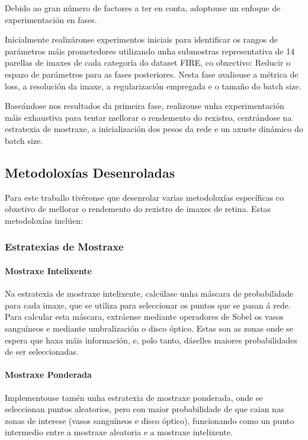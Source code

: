 Debido ao gran número de factores a ter en conta, adoptouse un enfoque de experimentación en fases.

Inicialmente realizáronse experimentos iniciais para identificar os rangos de parámetros máis prometedores utilizando unha submostras representativa de 14 parellas de imaxes de cada categoría do dataset FIRE, co obxectivo: Reducir o espazo de parámetros para as fases posteriores.
Nesta fase avaliouse a métrica de loss, a resolución da imaxe, a regularización empregada e o tamaño do batch size.

Baseándose nos resultados da primeira fase, realizouse unha experimentación máis exhaustiva para tentar mellorar o rendemento do rexistro, centrándose na estratexia de mostraxe, a inicialización dos pesos da rede e un axuste dinámico do batch size.

\subsection{Metodoloxías Desenroladas}
\label{subsec:Metodoloxías Desenroladas}

Para este traballo tivéronse que desenrolar varias metodoloxías específicas co obxetivo de mellorar o rendemento do rexistro de imaxes de retina. Estas metodoloxías inclúen:

\subsubsection{Estratexias de Mostraxe}
\label{subsubsec:estratexias_mostraxe}

\paragraph{Mostraxe Intelixente}
Na estratexia de mostraxe intelixente, calcúlase unha máscara de probabilidade para cada imaxe, que se utiliza para seleccionar os puntos que se pasan á rede. Para calcular esta máscara, extráense mediante operadores de Sobel os vasos sanguíneos e mediante umbralización o disco óptico. Estas son as zonas onde se espera que haxa máis información, e, polo tanto, dáselles maiores probabilidades de ser seleccionadas.

\paragraph{Mostraxe Ponderada}
Implementouse tamén unha estratexia de mostraxe ponderada, onde se seleccionan puntos aleatorios, pero con maior probabilidade de que caian nas zonas de interese (vasos sanguíneos e disco óptico), funcionando como un punto intermedio entre a mostraxe aleatoria e a mostraxe intelixente. 

